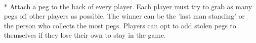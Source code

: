 \begin{minipage}{\textwidth}
\\*
Attach a peg to the back of every player.  Each player must try to grab as many pegs off other players as possible.  The winner can be the 'last man standing' or the person who collects the most pegs.  Players can opt to add stolen pegs to themselves if they lose their own to stay in the game.
\end{minipage}    \vfill
